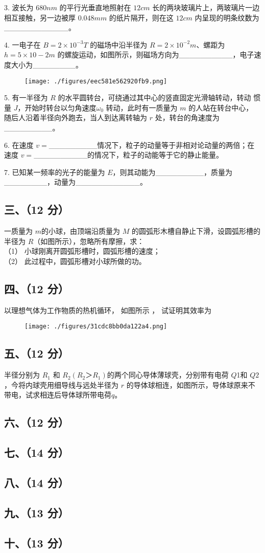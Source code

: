 3. 波长为 $680nm$ 的平行光垂直地照射在 $12cm$ 长的两块玻璃片上，两玻璃片一边相互接触，另一边被厚 $0.048mm$ 的纸片隔开，则在这 $12cm$ 内呈现的明条纹数为____________。

4. 一电子在 $B=2\times10^{-3}T$ 的磁场中沿半径为 $R=2\times10^{-2}m$、螺距为 $h=5\times10-2m$ 的螺旋运动，如图所示，则磁场方向为__________，电子速度大小为________。
\begin{figure}[ht]
\centering
\texttt{[image: ./figures/eec581e562920fb9.png]}
\caption{} \label{fig_NJUD4_2}
\end{figure}
5. 有一半径为 $R$ 的水平圆转台，可绕通过其中心的竖直固定光滑轴转动，转动
惯量 $J$，开始时转台以匀角速度$\omega_0$ 转动，此时有一质量为 $m$ 的人站在转台中心，
随后人沿着半径向外跑去，当人到达离转轴为 $r$ 处，转台的角速度为_________。

6. 在速度 $v=$_________情况下，粒子的动量等于非相对论动量的两倍；在速度
$v=$__________的情况下，粒子的动能等于它的静止能量。

7. 已知某一频率的光子的能量为 $E$，则其动能为_________，质量为________，动量为____________。
\subsection{三、（12 分）}
一质量为 $m$的小球，由顶端沿质量为 $M$ 的圆弧形木槽自静止下滑，设圆弧形槽的半径为 $R$（如图所示），忽略所有摩擦，求：\\
（1） 小球刚离开圆弧形槽时，圆弧形槽的速度；\\
（2） 此过程中，圆弧形槽对小球所做的功。
\subsection{四、（12 分）}
以理想气体为工作物质的热机循环， 如图所示 ， 试证明其效率为
\begin{figure}[ht]
\centering
\texttt{[image: ./figures/31cdc8bb0da122a4.png]}
\caption{} \label{fig_NJUD4_3}
\end{figure}
\subsection{五、（12 分）}
半径分别为 $R_1$ 和 $R_2(R_2＞R_1)$的两个同心导体薄球壳，分别带有电荷 $Q$1和 $Q2$，今将内球壳用细导线与远处半径为 $r$ 的导体球相连，如图所示，导体球原来不带电，试求相连后导体球所带电荷$q$。
\subsection{六、（12 分）}

\subsection{七、（14 分）}

\subsection{八、（14 分）}

\subsection{九、（13 分）}

\subsection{十、（13 分）}
